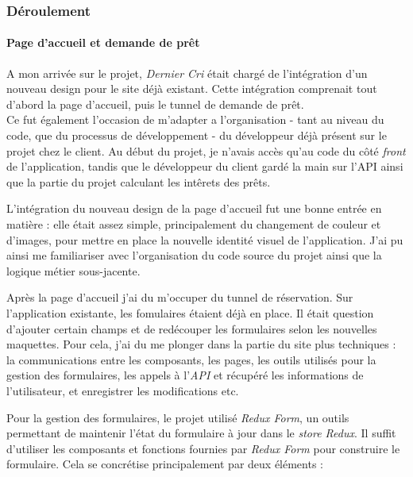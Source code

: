 \documentclass[12pt,a4paper]{article}
\begin{document}
  \bigskip

  \subsubsection{Déroulement}\label{duxe9roulement-1}

  \paragraph{Page d'accueil et demande de
  prêt}\label{page-daccueil-et-demande-de-pruxeat}

  \bigskip

  A mon arrivée sur le projet, \emph{Dernier Cri} était chargé de
  l'intégration d'un nouveau design pour le site déjà existant. Cette
  intégration comprenait tout d'abord la page d'accueil, puis le tunnel de
  demande de prêt.\\
  Ce fut également l'occasion de m'adapter a l'organisation - tant au
  niveau du code, que du processus de développement - du développeur déjà
  présent sur le projet chez le client. Au début du projet, je n'avais
  accès qu'au code du côté \emph{front} de l'application, tandis que le
  développeur du client gardé la main sur l'API ainsi que la partie du
  projet calculant les intêrets des prêts.

  \bigskip

  L'intégration du nouveau design de la page d'accueil fut une bonne
  entrée en matière : elle était assez simple, principalement du
  changement de couleur et d'images, pour mettre en place la nouvelle
  identité visuel de l'application. J'ai pu ainsi me familiariser avec
  l'organisation du code source du projet ainsi que la logique métier
  sous-jacente.

  \bigskip

  Après la page d'accueil j'ai du m'occuper du tunnel de réservation. Sur
  l'application existante, les fomulaires étaient déjà en place. Il était
  question d'ajouter certain champs et de redécouper les formulaires selon
  les nouvelles maquettes. Pour cela, j'ai du me plonger dans la partie du
  site plus techniques : la communications entre les composants, les
  pages, les outils utilisés pour la gestion des formulaires, les appels à
  l'\emph{API} et récupéré les informations de l'utilisateur, et
  enregistrer les modifications etc.

  \bigskip

  Pour la gestion des formulaires, le projet utilisé \emph{Redux Form}, un
  outils permettant de maintenir l'état du formulaire à jour dans le
  \emph{store Redux}. Il suffit d'utiliser les composants et fonctions
  fournies par \emph{Redux Form} pour construire le formulaire. Cela se
  concrétise principalement par deux éléments :
\end{document}

